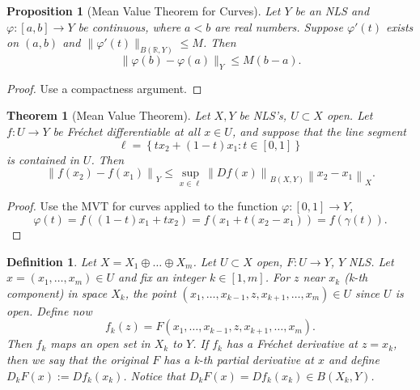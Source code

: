 \documentclass[letterpaper,twoside,12pt]{article}
\theoremstyle{mystyle}
\newtheorem{theorem}{Theorem}[section]
\newtheorem{definition}{Definition}[section]
\newtheorem{prop}{Proposition}[section]
\newcommand{\R}{{\mathbb R}}
\begin{document}
  \begin{tcolorbox}[colback=red!5!white,colframe=red!75!black]
    \begin{prop}[Mean Value Theorem for Curves]
      Let $Y$ be an NLS and $\varphi : [a,b] \to Y$ be continuous, where $a < b$ are real numbers. Suppose $\varphi ' (t)$ exists on $(a,b)$ and $\|\varphi'(t)\|_{B(\R,Y)} \leq M$. Then 
      \[\|\varphi(b) - \varphi(a)\|_Y \leq M(b-a).\]
    \end{prop}
  \end{tcolorbox}
  \begin{proof}
    Use a compactness argument. 
  \end{proof}

  \begin{tcolorbox}[colback=red!5!white,colframe=red!75!black]
    \begin{theorem}[Mean Value Theorem]
      Let $X,Y$ be NLS's, $U\subset X$ open. Let $f: U \to Y$ be Fr\'echet differentiable at all $x \in U$, and suppose that the line segment 
      \[\ell = \left\{ tx_2 + (1-t)x_1 : t\in [0,1]\right\} \]
      is contained in $U$. Then 
      \[{\left\| {f\left( {{x_2}} \right) - f\left( {{x_1}} \right)} \right\|_Y} \leqslant \mathop {\sup }\limits_{x \in \ell } {\left\| {Df\left( x \right)} \right\|_{B\left( {X,Y} \right)}}{\left\| {{x_2} - {x_1}} \right\|_X}.\]
    \end{theorem}
  \end{tcolorbox}
  \begin{proof}
    Use the MVT for curves applied to the function $\varphi : [0,1]\to Y$, 
    \[\varphi \left( t \right) = f\left( {\left( {1 - t} \right){x_1} + t{x_2}} \right) = f\left( {{x_1} + t\left( {{x_2} - {x_1}} \right)} \right) = f\left( {\gamma \left( t \right)} \right).\]
  \end{proof}

  \begin{definition}
    Let $X = X_1 \oplus \dots \oplus X_m$. Let $U \subset X$ open, $F:U\to Y$, $Y$ NLS. Let $x = (x_1, \dots, x_m)\in U$ and fix an integer $k \in [1,m]$. For $z$ near $x_k$ (k-th component) in space $X_k$, the point $(x_1, \dots, x_{k-1}, z, x_{k+1}, \dots, x_m) \in U$ since $U$ is open. Define now 
    \[f_k(z) = F(x_1, \dots, x_{k-1}, z, x_{k+1}, \dots, x_m).\]
    Then $f_k$ maps an open set in $X_k$ to $Y$. If $f_k$ has a Fr\'echet derivative at $z=x_k$, then we say that the original $F$ has a k-th partial derivative at $x$ and define $D_kF(x) := Df_k (x_k)$. Notice that $D_kF(x) = Df_k (x_k) \in B(X_k, Y)$. 
  \end{definition}
\end{document}
